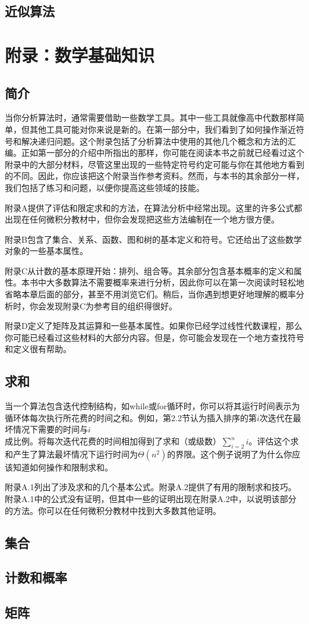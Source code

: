 \documentclass[lang=cn,newtx,10pt,scheme=chinese]{elegantbook}
\begin{document}
\chapter{近似算法}

\part{附录：数学基础知识}

\chapter*{简介}

当你分析算法时，通常需要借助一些数学工具。其中一些工具就像高中代数那样简单，但其他工具可能对你来说是新的。在第一部分中，我们看到了如何操作渐近符号和解决递归问题。这个附录包括了分析算法中使用的其他几个概念和方法的汇编。正如第一部分的介绍中所指出的那样，你可能在阅读本书之前就已经看过这个附录中的大部分材料，尽管这里出现的一些特定符号约定可能与你在其他地方看到的不同。因此，你应该把这个附录当作参考资料。然而，与本书的其余部分一样，我们包括了练习和问题，以便你提高这些领域的技能。

附录A提供了评估和限定求和的方法，在算法分析中经常出现。这里的许多公式都出现在任何微积分教材中，但你会发现把这些方法编制在一个地方很方便。

附录B包含了集合、关系、函数、图和树的基本定义和符号。它还给出了这些数学对象的一些基本属性。

附录C从计数的基本原理开始：排列、组合等。其余部分包含基本概率的定义和属性。本书中大多数算法不需要概率来进行分析，因此你可以在第一次阅读时轻松地省略本章后面的部分，甚至不用浏览它们。稍后，当你遇到想更好地理解的概率分析时，你会发现附录C为参考目的组织得很好。

附录D定义了矩阵及其运算和一些基本属性。如果你已经学过线性代数课程，那么你可能已经看过这些材料的大部分内容。但是，你可能会发现在一个地方查找符号和定义很有帮助。

\chapter*{求和}

当一个算法包含迭代控制结构，如while或for循环时，你可以将其运行时间表示为循环体每次执行所花费的时间之和。例如，第2.2节认为插入排序的第$i$次迭代在最坏情况下需要的时间与$i$成比例。将每次迭代花费的时间相加得到了求和（或级数）$\sum_{i=2}^n i$。评估这个求和产生了算法最坏情况下运行时间为$\Theta\left(n^2\right)$的界限。这个例子说明了为什么你应该知道如何操作和限制求和。

附录A.1列出了涉及求和的几个基本公式。附录A.2提供了有用的限制求和技巧。附录A.1中的公式没有证明，但其中一些的证明出现在附录A.2中，以说明该部分的方法。你可以在任何微积分教材中找到大多数其他证明。

\chapter*{集合}

\chapter*{计数和概率}

\chapter*{矩阵}
\end{document}
